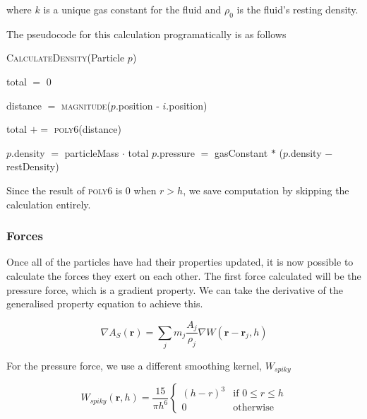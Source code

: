 \documentclass[12pt]{article}
\begin{document}
    where $k$ is a unique gas constant for the fluid and $\rho_0$ is the fluid's resting density.

    The pseudocode for this calculation programatically is as follows

    \begin{algorithm}[H]
        \caption{\textsc{CalculateDensity}(Particle $p$)}
    
        \begin{algorithmic}[1]
            \State total $=$ 0
            
                \State distance $=$ \textsc{magnitude}($p$.position - $i$.position)

                    \State total $+=$ \textsc{poly6}(distance)
                \EndIf
            \EndFor

            \State $p$.density $=$ particleMass $\cdot$ total
            \State $p$.pressure $=$ gasConstant $*$ ($p$.density $-$ restDensity)
        \end{algorithmic}

    \end{algorithm}

    Since the result of \textsc{poly6} is 0 when $r > h$, we save computation by skipping the calculation entirely.

    \subsubsection{Forces}

    Once all of the particles have had their properties updated, it is now possible to calculate the forces they exert on each other. The first force calculated will be the pressure force, which is a gradient property. We can take the derivative of the generalised property equation to achieve this.

    \begin{equation}
        \nabla A_S(\textbf{r}) = \sum_{j}{m_j \frac{A_j}{\rho_j}\nabla{W(\textbf{r} - \textbf{r}_j, h)}}
    \end{equation}

    For the pressure force, we use a different smoothing kernel, $W_{spiky}$

    \begin{equation}
        W_{spiky}(\textbf{r}, h) = \frac{15}{\pi{h}^6}
        \begin{cases}
            (h-r)^3 & \text{if } 0 \leq r \leq h \\
            0 & \text{otherwise}
        \end{cases} 
    \end{equation}
\end{document}
